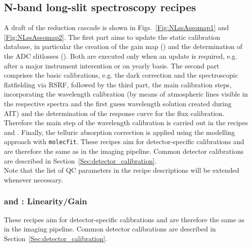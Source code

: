 \clearpage
\subsection{N-band long-slit spectroscopy recipes}
\label{ssec:recipes_lss_n}
A draft of the reduction cascade is shown in Figs.~\ref{Fig:NLssAssomap1} and \ref{Fig:NLssAssomap2}.%
The first part aims to update the static calibration database, in particular the creation of the gain map () and the determination of the \ac{ADC} slitlosses (). Both are executed only when an update is required, e.g. after a major instrument interention or on yearly basis. The second part comprises the basic calibrations, e.g. the dark correction and the spectroscopic flatfielding via \ac{RSRF}, followed by the third part, the main calibration steps, incorporating the wavelength calibration (by means of atmospheric lines visible in the respective spectra and the first guess wavelength solution created during \ac{AIT}) and the determination of the response curve for the flux calibration. Therefore the main step of the wavelength calibration is carried out in the recipes  and . Finally, the telluric absorption correction is applied using the modelling approach with \texttt{molecfit}.
These recipes aim for detector-specific calibrations and are therefore the same as in the imaging pipeline. Common detector calibrations are described in Section~\ref{Sec:detector_calibration}.\\
Note that the list of \ac{QC} parameters in the recipe descriptions will be extended whenever necessary.\\
\subsubsection{ and : Linearity/Gain}
These recipes aim for detector-specific calibrations and are therefore the same as in the imaging pipeline. Common detector calibrations are described in Section~\ref{Sec:detector_calibration}.


